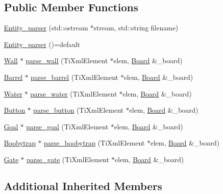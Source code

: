 \subsection*{Public Member Functions}
\begin{DoxyCompactItemize}
\item 
\hyperlink{class_entity__parser_ae71a89ee9d79647da978187f08c69b33}{Entity\-\_\-parser} (std\-::ostream $\ast$stream, std\-::string filename)
\item 
\hyperlink{class_entity__parser_a3efc9df13b6fd109315f4c6f36a76375}{Entity\-\_\-parser} ()=default
\item 
\hyperlink{class_wall}{Wall} $\ast$ \hyperlink{class_entity__parser_a4b5ec7aef90947d346db9cf6aeb8fe6b}{parse\-\_\-wall} (Ti\-Xml\-Element $\ast$elem, \hyperlink{class_board}{Board} \&\-\_\-board)
\item 
\hyperlink{class_barrel}{Barrel} $\ast$ \hyperlink{class_entity__parser_ac6460766a3fb0fb8a54e59f1a09c02f2}{parse\-\_\-barrel} (Ti\-Xml\-Element $\ast$elem, \hyperlink{class_board}{Board} \&\-\_\-board)
\item 
\hyperlink{class_water}{Water} $\ast$ \hyperlink{class_entity__parser_ab337768346e511822f49418ceb7a3549}{parse\-\_\-water} (Ti\-Xml\-Element $\ast$elem, \hyperlink{class_board}{Board} \&\-\_\-board)
\item 
\hyperlink{class_button}{Button} $\ast$ \hyperlink{class_entity__parser_a2c2da316e966ba3ac64d18874a4cd274}{parse\-\_\-button} (Ti\-Xml\-Element $\ast$elem, \hyperlink{class_board}{Board} \&\-\_\-board)
\item 
\hyperlink{class_goal}{Goal} $\ast$ \hyperlink{class_entity__parser_af9188db166e12f5def2c4423d259a57c}{parse\-\_\-goal} (Ti\-Xml\-Element $\ast$elem, \hyperlink{class_board}{Board} \&\-\_\-board)
\item 
\hyperlink{class_boobytrap}{Boobytrap} $\ast$ \hyperlink{class_entity__parser_ac1e5914d94309fe88069b1e8a5c071db}{parse\-\_\-boobytrap} (Ti\-Xml\-Element $\ast$elem, \hyperlink{class_board}{Board} \&\-\_\-board)
\item 
\hyperlink{class_gate}{Gate} $\ast$ \hyperlink{class_entity__parser_ab85fb730a2a1c07539aed278f204010b}{parse\-\_\-gate} (Ti\-Xml\-Element $\ast$elem, \hyperlink{class_board}{Board} \&\-\_\-board)
\end{DoxyCompactItemize}
\subsection*{Additional Inherited Members}


